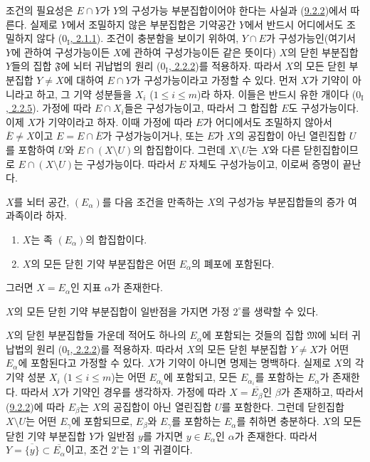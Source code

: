 조건의 필요성은 $E\cap Y$가 $Y$의 구성가능 부분집합이어야 한다는
사실과 (\hyperref[0.9.2.2-ko]{9.2.2})에서 따른다. 실제로 $Y$에서 조밀하지
않은 부분집합은 기약공간 $Y$에서 반드시 어디에서도 조밀하지 않다
(\hyperref[0.2.1.1-ko]{$0_{\mathrm I}$, 2.1.1}). 조건이 충분함을 보이기
위하여, $Y\cap E$가 구성가능인(여기서 $Y$에 관하여 구성가능이든
$X$에 관하여 구성가능이든 같은 뜻이다) $X$의 닫힌 부분집합 $Y$들의
집합 $\mathfrak{F}$에 뇌터 귀납법의 원리
(\hyperref[0.2.2.2-ko]{$0_{\mathrm I}$, 2.2.2})를 적용하자. 따라서
$X$의 모든 닫힌 부분집합 $Y\ne X$에 대하여 $E\cap Y$가 구성가능이라고
가정할 수 있다. 먼저 $X$가 기약이 아니라고 하고, 그 기약 성분들을
$X_i$ ($1\leq i\leq m$)라 하자. 이들은 반드시 유한 개이다
(\hyperref[0.2.2.5-ko]{$0_{\mathrm I}$, 2.2.5}). 가정에 따라
$E\cap X_i$들은 구성가능이고, 따라서 그 합집합 $E$도 구성가능이다.
이제 $X$가 기약이라고 하자. 이때 가정에 따라 $E$가 어디에서도
조밀하지 않아서 $\overline{E}\ne X$이고
$E=E\cap\overline{E}$가 구성가능이거나, 또는 $E$가 $X$의 공집합이
아닌 열린집합 $U$를 포함하여 $U$와 $E\cap(X\setminus U)$의
합집합이다. 그런데 $X\setminus U$는 $X$와 다른 닫힌집합이므로
$E\cap(X\setminus U)$는 구성가능이다. 따라서 $E$ 자체도 구성가능이고,
이로써 증명이 끝난다.

\begin{corollary}[9.2.4]
\label{0.9.2.4-ko}
$X$를 뇌터 공간, $(E_\alpha)$를 다음 조건을 만족하는 $X$의 구성가능
부분집합들의 증가 여과족이라 하자.
\begin{enumerate}
  \item[$1^\circ$] $X$는 족 $(E_\alpha)$의 합집합이다.
  \item[$2^\circ$] $X$의 모든 닫힌 기약 부분집합은 어떤 $E_\alpha$의
    폐포에 포함된다.
\end{enumerate}
그러면 $X=E_\alpha$인 지표 $\alpha$가 존재한다.

$X$의 모든 닫힌 기약 부분집합이 일반점을 가지면 가정 $2^\circ$를
생략할 수 있다.
\end{corollary}

$X$의 닫힌 부분집합들 가운데 적어도 하나의 $E_\alpha$에 포함되는
것들의 집합 $\mathfrak{M}$에 뇌터 귀납법의 원리
(\hyperref[0.2.2.2-ko]{$0_{\mathrm I}$, 2.2.2})를 적용하자. 따라서
$X$의 모든 닫힌 부분집합 $Y\ne X$가 어떤 $E_\alpha$에 포함된다고
가정할 수 있다. $X$가 기약이 아니면 명제는 명백하다. 실제로 $X$의
각 기약 성분 $X_i$ ($1\leq i\leq m$)는 어떤 $E_{\alpha_i}$에 포함되고,
모든 $E_{\alpha_i}$를 포함하는 $E_\alpha$가 존재한다. 따라서 $X$가
기약인 경우를 생각하자. 가정에 따라 $X=\overline{E_\beta}$인 $\beta$가
존재하고, 따라서 (\hyperref[0.9.2.2-ko]{9.2.2})에 따라 $E_\beta$는
$X$의 공집합이 아닌 열린집합 $U$를 포함한다. 그런데 닫힌집합
$X\setminus U$는 어떤 $E_\gamma$에 포함되므로, $E_\beta$와
$E_\gamma$를 포함하는 $E_\alpha$를 취하면 충분하다. $X$의 모든 닫힌
기약 부분집합 $Y$가
일반점 $y$를 가지면 $y\in E_\alpha$인 $\alpha$가 존재한다. 따라서
$Y=\overline{\{y\}}\subset\overline{E_\alpha}$이고, 조건 $2^\circ$는
$1^\circ$의 귀결이다.

